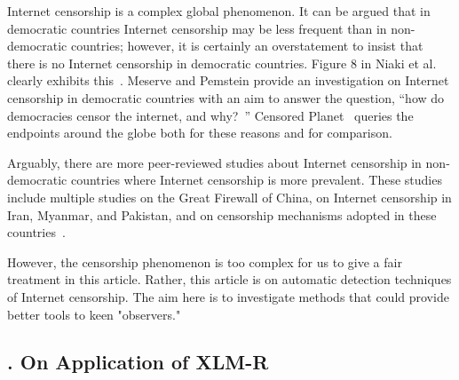 \noindent
	Internet censorship is a complex global phenomenon. It can be argued that in democratic
	countries Internet censorship may be less frequent than in non-democratic countries; however, it is
	certainly an overstatement to insist that there is no Internet censorship in democratic
	countries. Figure 8 in Niaki et al. clearly exhibits this~\cite{niaki2020iclab}.
	Meserve and Pemstein provide an investigation on Internet censorship in democratic
	countries with an aim to answer the question, ``how do democracies censor the internet,
	and why?~\cite{meserve2018google}'' Censored Planet~\cite{sundara_raman_censored_2020} queries the endpoints around the globe both for these reasons and for comparison.
 
    Arguably, there are more peer-reviewed studies
	about Internet censorship in non-democratic countries where Internet censorship is
	more prevalent. These studies include multiple studies on
	the Great Firewall of China, on Internet censorship in Iran, Myanmar, and Pakistan, 
	and on censorship mechanisms
	adopted in these countries~\cite{aryan2013internet, nabi2013anatomy, singh2017characterizing,
	ng2018detecting, bock2021even, padmanabhan2021multi}. 

	However, the censorship phenomenon is too complex
	for us to give a fair treatment in this article. Rather, this article is on automatic detection techniques
	of Internet censorship. The aim here is to investigate methods that could provide better tools to keen "observers." 


\subsection{. On Application of XLM-R}


